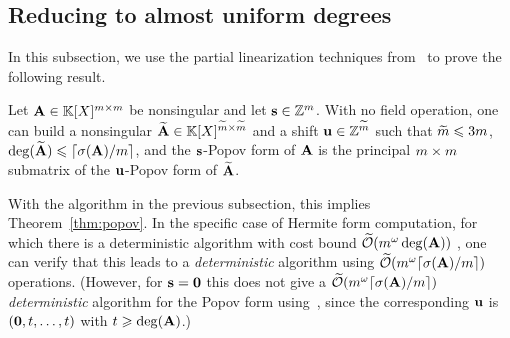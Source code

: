 \documentclass[preprint]{sig-alternate-05-2015}
\begin{document}
\subsection{Reducing to almost uniform degrees}
\label{subsec:partial_linearization}

In this subsection, we use the partial linearization techniques
from~\cite[Section 6]{GuSaStVa12} to prove the following result.

\vspace{-0.2cm}
\begin{prop}
  \label{prop:parlin_reduction}
  Let $\mat{A} \in \polMatSpace[\rdim]$ be nonsingular and let $\shifts \in
  \shiftSpace$. With no field operation, one can build a nonsingular
  $\expand{\mat{A}} \in \polMatSpace[\expand{\rdim}]$ and a shift $\shifts[u]
  \in \shiftSpace[\expand{\rdim}]$ such that $\expand{\rdim} \le 3\rdim$,
  $\deg(\expand{\mat{A}}) \le \lceil \degDet / \rdim \rceil$, and the
  $\shifts$-Popov form of $\mat{A}$ is the principal $\rdim \times \rdim$
  submatrix of the $\shifts[u]$-Popov form of $\expand{\mat{A}}$.
\end{prop}
\vspace{-0.15cm}
With the algorithm in the previous subsection, this implies
Theorem~\ref{thm:popov}. In the specific case of Hermite form computation, for
which there is a deterministic algorithm with cost bound
$\softO{\rdim^\expmatmul \deg(\mat{A})}$ \cite{ZhoLab16}, one can verify that
this leads to a \emph{deterministic} algorithm using $\softO{\rdim^\expmatmul
\lceil \degDet / \rdim \rceil}$ operations. (However, for $\shifts=\unishift$
this does not give a $\softO{\rdim^\expmatmul \lceil \degDet / \rdim \rceil}$
\emph{deterministic} algorithm for the Popov form
using~\cite{GuSaStVa12,SarSto11}, since the corresponding $\shifts[u]$ is
$(\unishift,t,\ldots,t)$ with $t \ge \deg(\mat{A})$.)
\end{document}
